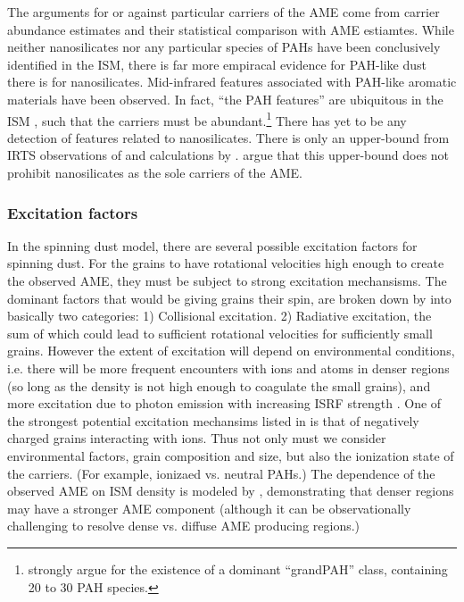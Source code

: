          The arguments for or against particular carriers of the AME come from carrier abundance estimates and their statistical comparison with AME estiamtes. While neither nanosilicates nor any particular species of PAHs have been conclusively identified in the ISM, there is far more empiracal evidence for PAH-like dust there is for nanosilicates. Mid-infrared features associated with PAH-like aromatic materials have been observed. In fact, ``the PAH features'' are ubiquitous in the ISM \citep{giard94,onaka96,onaka00}, such that the carriers must be abundant.\footnote{ \cite{andrews15} strongly argue for the  existence of a dominant ``grandPAH'' class, containing 20 to 30 PAH species.} There has yet to be any detection of features related to nanosilicates. There is only an upper-bound from IRTS observations of \cite{onaka96} and calculations by \cite{li01}. \cite{hensley17a} argue that this upper-bound does not prohibit nanosilicates as the sole carriers of the AME.

     \subsubsection{Excitation factors}
       In the spinning dust model, there are several possible excitation factors for spinning dust. For the grains to have rotational velocities high enough to create the observed AME, they must be subject to strong excitation mechansisms. The dominant factors that would be giving grains their spin, are broken down by \cite{draine11} into basically two categories: 1) Collisional excitation. 2) Radiative excitation, the sum of which could lead to sufficient rotational velocities for sufficiently small grains. However the extent of excitation will depend on environmental conditions, i.e. there will be more frequent encounters with ions and atoms in denser regions (so long as the density is not high enough to coagulate the small grains), and more excitation due to photon emission with increasing ISRF strength \citep{ali-haimoud09, ali-haimoud14}. One of the strongest potential excitation mechansims listed in \cite{draine11} is that of negatively charged grains interacting with ions. Thus not only must we consider environmental factors, grain composition and size, but also the ionization state of the carriers. (For example, ionizaed vs. neutral PAHs.) The dependence of the observed AME on ISM density is modeled by \cite{ali-haimoud10}, demonstrating that denser regions may have a stronger AME component (although it can be observationally challenging to resolve dense vs. diffuse AME producing regions.)

